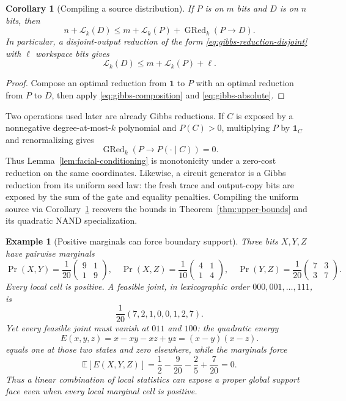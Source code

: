 \documentclass{article}
\newcommand{\LC}{\mathcal{L}}
\newcommand{\GRed}{\operatorname{GRed}}
\newcommand{\E}{\mathbb{E}}
\newtheorem{corollary}{Corollary}
\newtheorem{example}{Example}
\begin{document}
\begin{corollary}[Compiling a source distribution]
\label{cor:gibbs-reduction-compilation}
If $P$ is on $m$ bits and $D$ is on $n$ bits, then
\[
  n+\LC_k(D)
  \le
  m+\LC_k(P)+\GRed_k(P\mathbin{\to}D).
  \tag{Sub}\label{eq:gibbs-compilation}
\]
In particular, a disjoint-output reduction of the form
\eqref{eq:gibbs-reduction-disjoint} with $\ell$
workspace bits gives
\[
  \LC_k(D)\le m+\LC_k(P)+\ell.
\]
\end{corollary}

\begin{proof}
Compose an optimal reduction from $\mathbf 1$ to $P$ with an optimal reduction
from $P$ to $D$, then apply \eqref{eq:gibbs-composition} and
\eqref{eq:gibbs-absolute}.
\end{proof}

Two operations used later are already Gibbs reductions.  If $C$ is exposed by
a nonnegative degree-at-most-$k$ polynomial and $P(C)>0$, multiplying $P$ by
$\mathbf 1_C$ and renormalizing gives
\[
  \GRed_k(P\mathbin{\to}P(\mathord\cdot\mid C))=0.
\]
Thus Lemma~\ref{lem:facial-conditioning} is monotonicity under a zero-cost
reduction on the same coordinates.  Likewise, a circuit generator is a Gibbs
reduction from its uniform seed law: the fresh trace and output-copy bits are
exposed by the sum of the gate and equality penalties.  Compiling the uniform
source via Corollary~\ref{cor:gibbs-reduction-compilation} recovers the bounds
in Theorem~\ref{thm:upper-bounds} and its quadratic NAND specialization.

\begin{example}[Positive marginals can force boundary support]
\label{ex:positive-marginals-boundary}
Three bits $X,Y,Z$ have pairwise marginals
\[
\Pr(X,Y)=\frac1{20}\begin{pmatrix}9&1\\1&9\end{pmatrix},\quad
\Pr(X,Z)=\frac1{10}\begin{pmatrix}4&1\\1&4\end{pmatrix},\quad
\Pr(Y,Z)=\frac1{20}\begin{pmatrix}7&3\\3&7\end{pmatrix}.
\]
Every local cell is positive.  A feasible joint, in lexicographic order
$000,001,\ldots,111$, is
\[
  \frac1{20}(7,2,1,0,0,1,2,7).
\]
Yet every feasible joint must vanish at $011$ and $100$: the quadratic energy
\[
  E(x,y,z)=x-xy-xz+yz=(x-y)(x-z).
\]
equals one at those two states and zero elsewhere, while the marginals force
\[
  \E[E(X,Y,Z)]
  =\frac12-\frac9{20}-\frac25+\frac7{20}=0.
\]
Thus a linear combination of local statistics can expose a proper global
support face even when every local marginal cell is positive.
\end{example}
\end{document}
